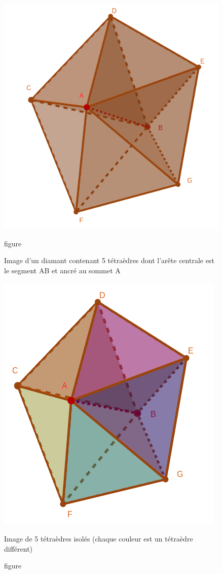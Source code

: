 \documentclass[a4paper,11pt,openany]{article}
\begin{document}
\begin{figure}[H]
\centering
\begin{minipage}{.5\textwidth}
  \centering
  \includegraphics[scale=0.25]{Images/central_edge_AB}
  \caption{figure}{Image d'un diamant contenant 5 tétraèdres dont l'arête centrale est le segment AB et ancré au sommet A}
  \label{fig:central_edge_AB}
\end{minipage}%
\begin{minipage}{.5\textwidth}
  \centering
  \includegraphics[scale=0.32]{Images/explosion_diamond}
  \caption{figure}{Image de 5 tétraèdres isolés (chaque couleur est un tétraèdre différent)}
  \label{fig:explosion_diamond}
\end{minipage}
\end{figure}
\end{document}
